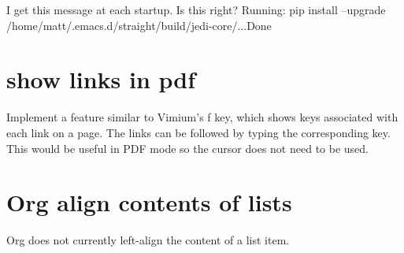\documentclass{default}
\begin{document}
I get this message at each startup. Is this right? Running: pip install --upgrade /home/matt/.emacs.d/straight/build/jedi-core/...Done

\section{show links in pdf}

Implement a feature similar to Vimium's f key, which shows keys associated with each link on a
page. The links can be followed by typing the corresponding key. This would be useful in PDF mode so
the cursor does not need to be used.

\section{Org align contents of lists}

Org does not currently left-align the content of a list item.
\end{document}
